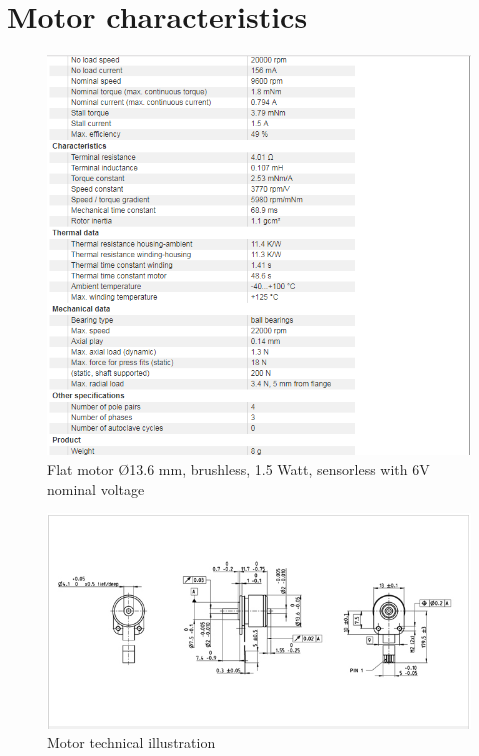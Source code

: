 \chapter{Motor characteristics}\label{chap: motorDatashit}
%
\begin{figure}[H]
	\centering
	\includegraphics[width=0.7\linewidth]{figures/motorchar}
	\caption{ Flat motor $Ø$13.6 mm, brushless, 1.5 Watt, sensorless with 6V nominal voltage}
	\label{fig:323}
\end{figure}
%
\begin{figure}[H]
	\centering
	\includegraphics[width=0.7\linewidth]{figures/motor}
	\caption{Motor technical illustration}
	\label{fig:32}
\end{figure}
